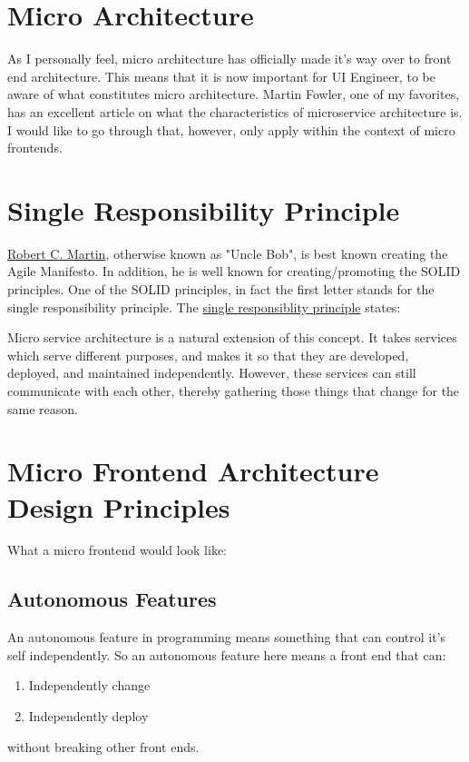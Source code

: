 \section{Micro Architecture}
As I personally feel, micro architecture has officially made it's way over to front end architecture. This means that it is now important for UI Engineer, to be aware of what constitutes micro architecture. Martin Fowler, one of my favorites, has an excellent article on what the characteristics of microservice architecture is. I would like to go through that, however, only apply within the context of micro frontends.

\section{Single Responsibility Principle}
\href{https://en.wikipedia.org/wiki/Robert_C._Martin}{Robert C. Martin}, otherwise known as "Uncle Bob", is best known creating the Agile Manifesto. In addition, he is well known for creating/promoting the SOLID principles. One of the SOLID principles, in fact the first letter stands for the single responsibility principle. The \href{https://en.wikipedia.org/wiki/Single_responsibility_principle}{single responsiblity principle} states:

\begin{quote}
\end{quote}

Micro service architecture is a natural extension of this concept. It takes services which serve different purposes, and makes it so that they are developed, deployed, and maintained independently. However, these services can still communicate with each other, thereby gathering those things that change for the same reason.  

\section{Micro Frontend Architecture Design Principles}
What a micro frontend would look like:

\subsection{Autonomous Features}
An autonomous feature in programming means something that can control it's self independently. So an autonomous feature here means a front end that can:
\begin{enumerate}
  \item Independently change 
  \item Independently deploy 
\end{enumerate}
without breaking other front ends. 

